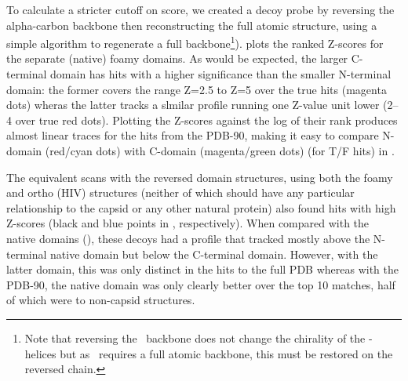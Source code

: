To calculate a stricter cutoff on score, we created a decoy probe by reversing the
alpha-carbon backbone then reconstructing the full atomic structure, using a simple algorithm
to regenerate a full backbone\footnote{
Note that reversing the \CA\ backbone does not change the chirality of the \A-helices
but as \DALI\ requires a full atomic backbone, this must be restored on the reversed chain.
}).
 plots the ranked Z-scores for the separate (native) foamy domains.
As would be expected, the larger C-terminal domain has hits with a higher significance than the
smaller N-terminal domain:  the former covers the range Z=2.5 to Z=5 over the true hits (magenta
dots) wheras the latter tracks a slmilar profile running one Z-value unit lower (2--4 over true
red dots).  Plotting the Z-scores against the log of their rank produces almost linear traces
for the hits from the PDB-90, making it easy to compare N-domain (red/cyan dots) with C-domain 
(magenta/green dots) (for T/F hits) in .

The equivalent scans with the reversed domain structures, using both the foamy and ortho (HIV) structures 
(neither of which should have any particular relationship to the capsid or any other natural protein)
also found hits with high Z-scores (black and blue points in , respectively).
When compared with the native domains (), these decoys had a profile that tracked mostly above
the N-terminal native domain but below the C-terminal domain.  However, with the latter domain, this
was only distinct in the hits to the full PDB whereas with the PDB-90, the native domain was only clearly 
better over the top 10 matches, half of which were to non-capsid structures.

 
